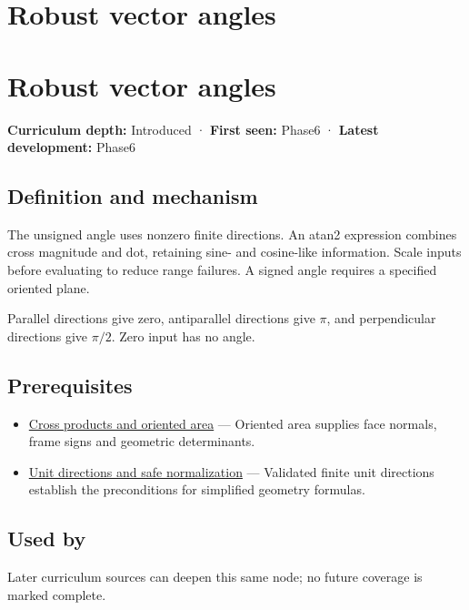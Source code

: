 \hypertarget{appendix-e569e60e18e6}{}
\section*{Robust vector angles}
\section{Robust vector angles}\label{appendix-e569e60e18e6-robust-vector-angles}

\textbf{Curriculum depth:} Introduced · \textbf{First seen:} Phase6 · \textbf{Latest development:} Phase6

\subsection{Definition and mechanism}\label{appendix-e569e60e18e6-definition-and-mechanism}

The unsigned angle uses nonzero finite directions. An atan2 expression combines cross magnitude and dot, retaining sine- and cosine-like information. Scale inputs before evaluating to reduce range failures. A signed angle requires a specified oriented plane.

Parallel directions give zero, antiparallel directions give \(\pi\), and perpendicular directions give \(\pi/2\). Zero input has no angle.

\subsection{Prerequisites}\label{appendix-e569e60e18e6-prerequisites}

\begin{itemize}
\tightlist
\item
  \hyperref[appendix-2391db8052b1]{Cross products and oriented area} --- Oriented area supplies face normals, frame signs and geometric determinants.
\item
  \hyperref[appendix-f744e41b95b4]{Unit directions and safe normalization} --- Validated finite unit directions establish the preconditions for simplified geometry formulas.
\end{itemize}

\subsection{Used by}\label{appendix-e569e60e18e6-used-by}

Later curriculum sources can deepen this same node; no future coverage is marked complete.


